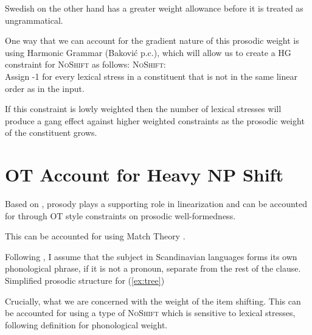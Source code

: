 \documentclass[12pt, letterpaper]{article}
\begin{document}
\ex Swedish on the other hand has a greater weight allowance before it is treated as ungrammatical. 

\ex One way that we can account for the gradient nature of this prosodic weight is using Harmonic Grammar (Baković p.c.), which will allow us to create a HG constraint for \textsc{NoShift} as follows:
	\ea \textsc{NoShift}:\\
	Assign -1 for every lexical stress in a constituent that is not in the same linear order as in the input.
	\z 

\ex If this constraint is lowly weighted then the number of lexical stresses will produce a gang effect against higher weighted constraints as the prosodic weight of the constituent grows. 


\z 

\section{OT Account for Heavy NP Shift} \label{sec:HNPS}

\ea Based on \citet{anttilaRoleProsodyEnglish2010}, prosody plays a supporting role in linearization and can be accounted for through OT style constraints on prosodic well-formedness. 

\ex This can be accounted for using Match Theory \citep{selkirkClauseIntonationalPhrase2009,selkirkSyntaxPhonologyInterface2011}.

\ex Following \citet{myrbergSisterhoodProsodicBranching2013,myrbergProsodicWordSwedish2013,myrbergProsodicHierarchySwedish2015}, I assume that the subject in Scandinavian languages forms its own phonological phrase, if it is not a pronoun, separate from the rest of the clause. 
	\ea \label{ex:ProsodicTree} Simplified prosodic structure for (\ref{ex:tree})\\

	\z

\ex Crucially, what we are concerned with the weight of the item shifting. This can be accounted for using a type of \textsc{NoShift} \citep{bennettLightestRightApparently2016} which is sensitive to lexical stresses, following  definition for phonological weight.
\end{document}
